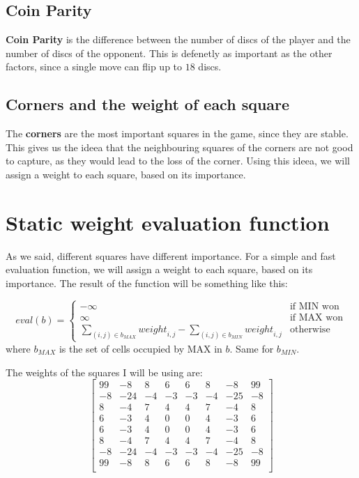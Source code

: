 \documentclass{article}
\begin{document}
\subsection*{Coin Parity}
\quad \textbf{Coin Parity} is the difference between the number of discs of the player and the number of discs of the opponent.
This is defenetly as important as the other factors, since a single move can flip up to $18$ discs.

\subsection*{Corners and the weight of each square}
\quad The \textbf{corners} are the most important squares in the game, since they are stable. 
This gives us the ideea that the neighbouring squares of the corners are not good to capture, as they would lead to the loss of the corner.
Using this ideea, we will assign a weight to each square, based on its importance.

\section*{Static weight evaluation function}
\quad As we said, different squares have different importance. 
For a simple and fast evaluation function, we will assign a weight to each square, based on its importance.
The result of the function will be something like this:

\[
  \text{$eval$}(b) = 
  \begin{cases}
    -\infty & \text{if MIN won} \\
    \infty & \text{if MAX won} \\
    \sum_{(i,j) \in b_{MAX}} \text{$weight$}_{i,j} - \sum_{(i,j) \in b_{MIN}} \text{$weight$}_{i,j} & \text{otherwise}
  \end{cases}
\]
where $b_{MAX}$ is the set of cells occupied by MAX in $b$. Same for $b_{MIN}$.

The weights of the squares I will be using are:
\[
  \begin{bmatrix}
    99 & -8 & 8 & 6 & 6 & 8 & -8 & 99 \\
    -8 & -24 & -4 & -3 & -3 & -4 & -25 & -8 \\
    8 & -4 & 7 & 4 & 4 & 7 & -4 & 8 \\
    6 & -3 & 4 & 0 & 0 & 4 & -3 & 6 \\
    6 & -3 & 4 & 0 & 0 & 4 & -3 & 6 \\
    8 & -4 & 7 & 4 & 4 & 7 & -4 & 8 \\
    -8 & -24 & -4 & -3 & -3 & -4 & -25 & -8 \\
    99 & -8 & 8 & 6 & 6 & 8 & -8 & 99 \\
  \end{bmatrix}
\]
\end{document}
